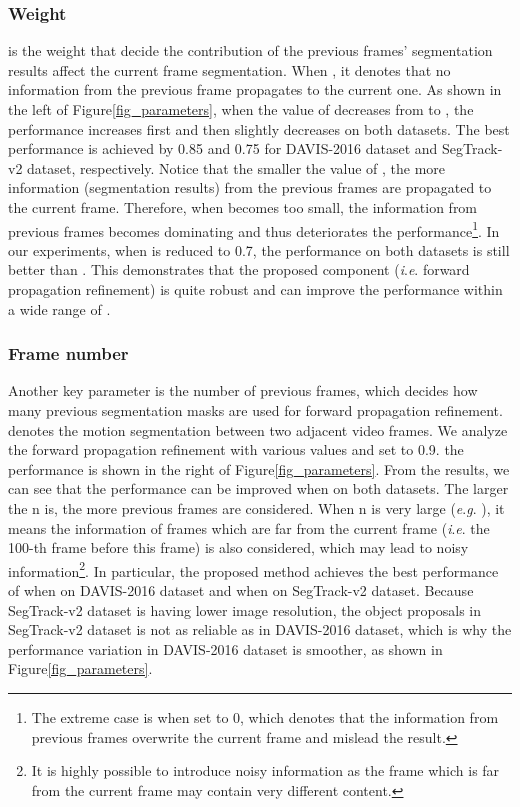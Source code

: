\documentclass[journal]{IEEEtran}
\makeatletter
\newcommand{\ie}{\textit{i}.\textit{e}. }
\newcommand{\eg}{\textit{e}.\textit{g}. }
\newcommand{\fig}{{Figure}\@\xspace}
\makeatother
\begin{document}
\subsubsection{Weight }
 is the weight that decide the contribution of the previous frames' segmentation results affect the current frame segmentation. 
When , it denotes that no information from the previous frame propagates to the current one. As shown in the left of \fig \ref{fig_parameters}, when the value of  decreases from  to , the performance increases first and then slightly decreases on both datasets. The best performance is achieved by  0.85 and 0.75 for DAVIS-2016 dataset and SegTrack-v2 dataset, respectively. Notice that the smaller the value of , the more information (segmentation results) from the previous frames are propagated to the current frame. Therefore, when  becomes too small, the information from previous frames becomes dominating and thus deteriorates the performance\footnote{The extreme case is when  set to 0, which denotes that the information from previous frames overwrite the current frame and mislead the result.}. In our experiments, when  is reduced to 0.7, the performance on both datasets is still better than . This demonstrates that the proposed component (\ie forward propagation refinement) is quite robust and can improve the performance within a wide range of .

\subsubsection{Frame number }
Another key parameter is the number of previous frames, 
which decides how many previous segmentation masks are used for forward propagation refinement.
 denotes the motion segmentation between two adjacent video frames.
We analyze the forward propagation refinement with various  values and  set to 0.9.
the performance is shown in the right of \fig \ref{fig_parameters}.
From the results, we can see that the performance can be improved when  on both datasets. 
The larger the n is, the more previous frames are considered. 
When n is very large (\eg ), it means the information of frames which are far from the current frame (\ie the 100-th frame before this frame) is also considered, which may lead to noisy information\footnote{It is highly possible to introduce noisy information as the frame which is far from the current frame may contain very different content.}.
In particular, the proposed method achieves the best performance of  when  on DAVIS-2016 dataset and  when  on SegTrack-v2 dataset.
Because SegTrack-v2 dataset is having lower image resolution, the object proposals in SegTrack-v2 dataset is not as reliable as in DAVIS-2016 dataset, 
which is why the performance variation in DAVIS-2016 dataset is smoother, as shown in \fig \ref{fig_parameters}.
\end{document}
